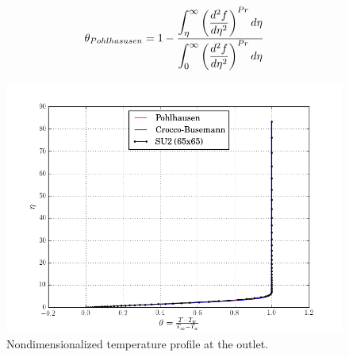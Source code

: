 \documentclass[12pt,letterpaper]{article}
\begin{document}
\begin{equation*}
\theta_{Pohlhasusen} = 1 - \dfrac{\mathlarger{\mathlarger{\int_{\eta}^{\infty}}}\left( \dfrac{d^2f}{d\eta^2}\right)^{Pr}d\eta}{\mathlarger{\mathlarger{\int_{0}^{\infty}}}\left( \dfrac{d^2f}{d\eta^2}\right)^{Pr}d\eta}
\end{equation*}

\begin{figure}[h] 
\centering
\includegraphics[width=\linewidth]{temp_350.png}
\caption{Nondimensionalized temperature profile at the outlet.}
\label{fig:temp}
\end{figure}
\end{document}
